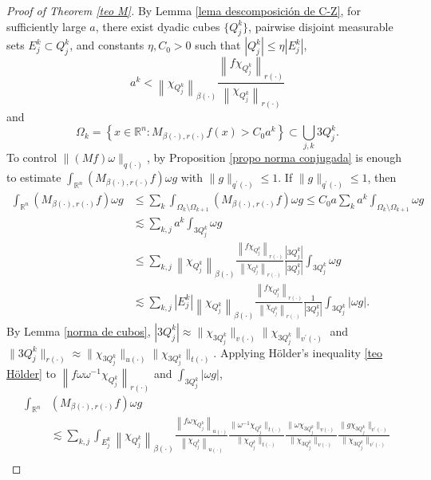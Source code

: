 \documentclass[a4paper,11pt,reqno]{amsart}
\theoremstyle{plain}
\numberwithin{equation}{section}
\theoremstyle{definition}
\newcommand{\R}{{\mathbb{R}^n}}
\begin{document}
\begin{proof}[Proof of Theorem \ref{teo M}]
	By Lemma \ref{lema descomposición de C-Z}, for sufficiently large $a$, there exist dyadic cubes $\{Q_j^k\}$, pairwise disjoint measurable sets $E_j^k\subset Q_j^k$, and constants $\eta,C_0>0$ such that $|Q_j^k|\leq \eta |E_j^k|$,
	\begin{equation*}
		a^k<\left\|\chi_{Q_j^k}\right\|_{\beta(\cdot)}\frac{\left\|f\chi_{Q_j^k}\right\|_{r(\cdot)}}{\left\|\chi_{Q_j^k}\right\|_{r(\cdot)}}
	\end{equation*}
	and
	\begin{equation*}
		\Omega_k=\left\{x\in{\R}: M_{{\beta(\cdot)},{r(\cdot)}}f(x)>C_0a^k\right\}\subset\bigcup_{j,k}3Q_j^k.
	\end{equation*}
	To control $\|(Mf)\omega\|_{q(\cdot)}$, by Proposition \ref{propo norma conjugada} is enough to estimate $\int_{\R} \left(M_{{\beta(\cdot)},{r(\cdot)}}f\right)\omega g$ with $\|g\|_{q^\prime(\cdot)}\leq1$. If $\|g\|_{q^\prime(\cdot)}\leq 1$, then
	\begin{align*}
		\int_{\R} \left(M_{{\beta(\cdot)},{r(\cdot)}}f\right)\omega g&\leq \sum_{k}\int_{\Omega_k\setminus\Omega_{k+1}} \left(M_{{\beta(\cdot)},{r(\cdot)}}f\right)\omega g\leq C_0 a\sum_{k}a^k\int_{\Omega_k\setminus\Omega_{k+1}} \omega g\\
		&\lesssim \sum_{k,j}a^k\int_{3Q_j^k}\omega g\\
		&\leq \sum_{k,j} \left\|\chi_{Q_j^k}\right\|_{\beta(\cdot)}\frac{\left\|f\chi_{Q_j^k}\right\|_{r(\cdot)}}{\left\|\chi_{Q_j^k}\right\|_{r(\cdot)}} \frac{\left|3Q_j^k\right|}{\left|3Q_j^k\right|}\int_{3Q_j^k}\omega g\\
		&\lesssim \sum_{k,j} \left|E_j^k\right| \left\|\chi_{Q_j^k}\right\|_{\beta(\cdot)}\frac{\left\|f\chi_{Q_j^k}\right\|_{r(\cdot)}}{\left\|\chi_{Q_j^k}\right\|_{r(\cdot)}} \frac{1}{\left|3Q_j^k\right|}\int_{3Q_j^k}|\omega g|.
	\end{align*}
By Lemma \ref{norma de cubos}, $|3Q_j^k|\approx\|\chi_{3Q_j^k}\|_{v(\cdot)}\|\chi_{3Q_j^k}\|_{v^\prime(\cdot)}$ and $\|3Q_j^k\|_{r(\cdot)}\approx\|\chi_{3Q_j^k}\|_{u(\cdot)}\|\chi_{3Q_j^k}\|_{t(\cdot)}$. Applying Hölder's inequality \ref{teo Hölder} to $\left\|f\omega\omega^{-1}\chi_{Q_j^k}\right\|_{r(\cdot)}$ and $\int_{3Q_j^k}|\omega g|$,
	\begin{align*}
		\int_{\R} &\left(M_{{\beta(\cdot)},{r(\cdot)}}f\right)\omega g\\
		&\lesssim \sum_{k,j}\int_{E_j^k}\left\|\chi_{Q_j^k}\right\|_{\beta(\cdot)}\frac{\left\|f\omega\chi_{Q_j^k}\right\|_{u(\cdot)}}{\left\|\chi_{Q_j^k}\right\|_{u(\cdot)}}\frac{\|\omega^{-1}\chi_{Q_j^k}\|_{t(\cdot)}}{\|\chi_{Q_j^k}\|_{t(\cdot)}} \frac{\|\omega\chi_{3Q_j^k}\|_{v(\cdot)}}{\|\chi_{3Q_j^k}\|_{v(\cdot)}}\frac{\|g\chi_{3Q_j^k}\|_{v^\prime(\cdot)}}{\|\chi_{3Q_j^k}\|_{v^\prime(\cdot)}}\\

\end{align*}
\end{proof}
\end{document}
